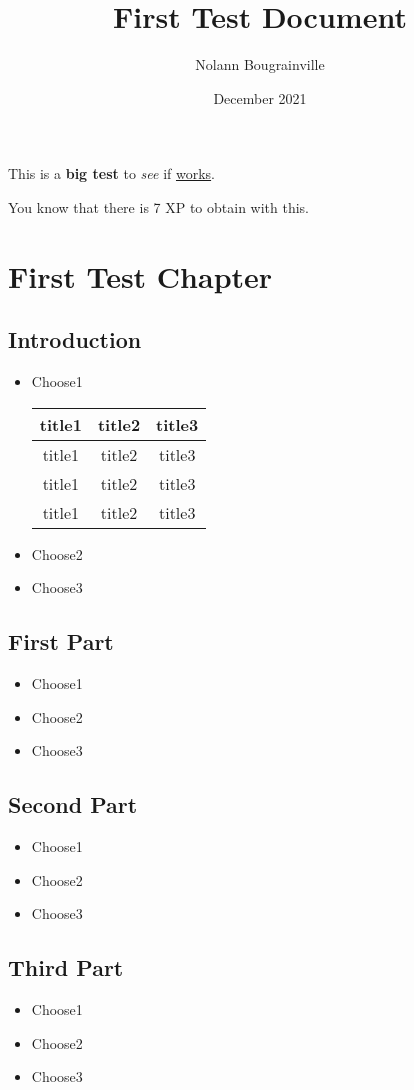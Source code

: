 \documentclass[12pt, letterpaper, twoside]{article}
\title{First Test Document}
\author{Nolann Bougrainville}
\date{December 2021}
\begin{document}
\maketitle
    \begin{center}
        This is a \textbf{big test} to \textit{see} if \underline{works}.
        
        You know that there is 7 XP to obtain with this.
    \end{center}
    \newpage
    \tableofcontents
    \newpage
    \section{First Test Chapter}
        \subsection{Introduction}
        \begin{itemize}
            \item Choose1

            \begin{tabular}{|c|c|c|}
                \hline
                \textbf{title1} & \textbf{title2} & \textbf{title3} \\
                \hline
                {title1} & {title2} & {title3} \\
                \hline
                {title1} & {title2} & {title3} \\
                \hline
                {title1} & {title2} & {title3} \\
                \hline
            \end{tabular}
            \item Choose2
            \item Choose3
        \end{itemize}
        \subsection{First Part}
        \begin{itemize}
            \item Choose1
            \item Choose2
            \item Choose3
        \end{itemize}
        \subsection{Second Part}
        \begin{itemize}
            \item Choose1
            \item Choose2
            \item Choose3
        \end{itemize}
        \subsection{Third Part}
        \begin{itemize}
            \item Choose1
            \item Choose2
            \item Choose3
        \end{itemize}
    \newpage
\end{document}
